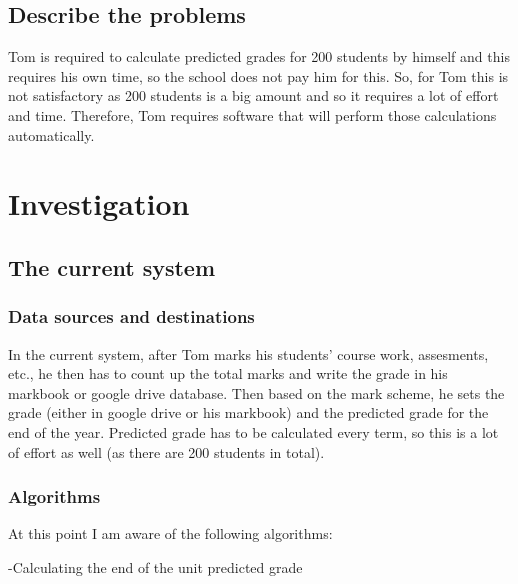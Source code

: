 \subsection{Describe the problems}

Tom is required to calculate predicted grades for 200 students by himself and this requires his own time, so the school does not pay him for this. So, for Tom this is not satisfactory as 200 students is a big amount and so it requires a lot of effort and time. Therefore, Tom requires software that will perform those calculations automatically. 

\section{Investigation}

\subsection{The current system}
\subsubsection{Data sources and destinations}

In the current system, after Tom marks his students' course work, assesments, etc., he then has to count up the total marks and write the grade in his markbook or google drive database. Then based on the mark scheme, he sets the grade (either in google drive or his markbook) and the predicted grade for the end of the year. Predicted grade has to be calculated every term, so this is a lot of effort as well (as there are 200 students in total).

\subsubsection{Algorithms}
At this point I am aware of the following algorithms:

-Calculating the end of the unit predicted grade

\EndFor
{}


